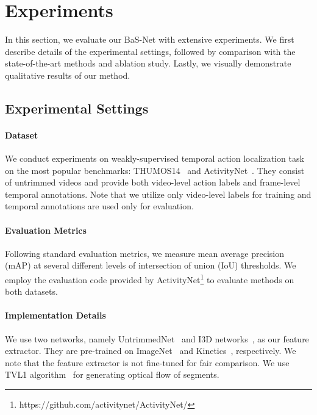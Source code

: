 \documentclass[letterpaper]{article} %
\begin{document}
\begin{table}[t]
\begin{center}
{\begin{tabular}{c|l|ccccccccc}
\end{tabular}
}
\end{center}
\label{table:quant_thumos}
\end{table}

\section{Experiments}
\label{sec:experiments}
In this section, we evaluate our BaS-Net with extensive experiments. We first describe details of the experimental settings, followed by comparison with the state-of-the-art methods and ablation study. Lastly, we visually demonstrate qualitative results of our method.

\subsection{Experimental Settings}
\paragraph{Dataset} We conduct experiments on weakly-supervised temporal action localization task on the most popular benchmarks: THUMOS14~\cite{THUMOS14} and ActivityNet~\cite{caba2015activitynet}. They consist of untrimmed videos and provide both video-level action labels and frame-level temporal annotations. Note that we utilize only video-level labels for training and temporal annotations are used only for evaluation.

\paragraph{Evaluation Metrics} Following standard evaluation metrics, we measure mean average precision (mAP) at several different levels of intersection of union (IoU) thresholds. We employ the evaluation code provided by ActivityNet\footnote{https://github.com/activitynet/ActivityNet/} to evaluate methods on both datasets.

\paragraph{Implementation Details}
We use two networks, namely UntrimmedNet~\cite{wang2017untrimmednets} and I3D networks~\cite{carreira2017quo}, as our feature extractor. They are pre-trained on ImageNet~\cite{deng2009imagenet} and Kinetics~\cite{carreira2017quo}, respectively. We note that the feature extractor is not fine-tuned for fair comparison. We use TVL1 algorithm~\cite{wedel2009improved} for generating optical flow of segments.
\end{document}
